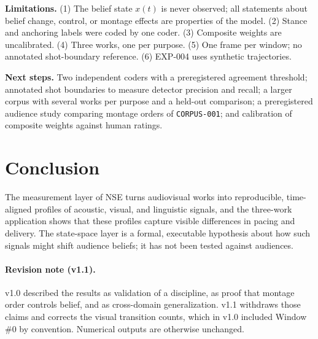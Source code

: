 \documentclass[10pt,letterpaper]{article}
\begin{document}
\textbf{Limitations.} (1) The belief state $x(t)$ is never observed; all statements about belief change, control, or montage effects are properties of the model. (2) Stance and anchoring labels were coded by one coder. (3) Composite weights are uncalibrated. (4) Three works, one per purpose. (5) One frame per window; no annotated shot-boundary reference. (6) EXP-004 uses synthetic trajectories.

\textbf{Next steps.} Two independent coders with a preregistered agreement threshold; annotated shot boundaries to measure detector precision and recall; a larger corpus with several works per purpose and a held-out comparison; a preregistered audience study comparing montage orders of \texttt{CORPUS-001}; and calibration of composite weights against human ratings.

\section{Conclusion}

The measurement layer of NSE turns audiovisual works into reproducible, time-aligned profiles of acoustic, visual, and linguistic signals, and the three-work application shows that these profiles capture visible differences in pacing and delivery. The state-space layer is a formal, executable hypothesis about how such signals might shift audience beliefs; it has not been tested against audiences.

\paragraph{Revision note (v1.1).} v1.0 described the results as validation of a discipline, as proof that montage order controls belief, and as cross-domain generalization. v1.1 withdraws those claims and corrects the visual transition counts, which in v1.0 included Window \#0 by convention. Numerical outputs are otherwise unchanged.



\end{document}
